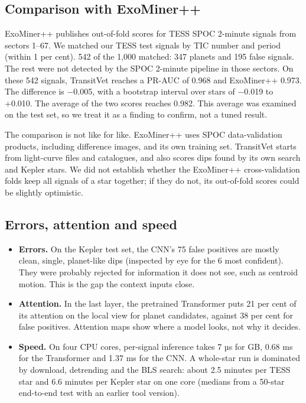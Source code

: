 \documentclass[fleqn,usenatbib]{mnras}
\providecommand{\tightlist}{\setlength{\itemsep}{0pt}\setlength{\parskip}{0pt}}
\begin{document}
\subsection{Comparison with ExoMiner++}

ExoMiner++ publishes out-of-fold scores for TESS SPOC 2-minute signals from sectors 1--67. We matched our TESS test signals by TIC number and period (within 1 per cent). 542 of the 1,000 matched: 347 planets and 195 false signals. The rest were not detected by the SPOC 2-minute pipeline in those sectors. On these 542 signals, TransitVet reaches a PR-AUC of 0.968 and ExoMiner++ 0.973. The difference is −0.005, with a bootstrap interval over stars of −0.019 to +0.010. The average of the two scores reaches 0.982. This average was examined on the test set, so we treat it as a finding to confirm, not a tuned result.

The comparison is not like for like. ExoMiner++ uses SPOC data-validation products, including difference images, and its own training set. TransitVet starts from light-curve files and catalogues, and also scores dips found by its own search and Kepler stars. We did not establish whether the ExoMiner++ cross-validation folds keep all signals of a star together; if they do not, its out-of-fold scores could be slightly optimistic.

\subsection{Errors, attention and speed}

\begin{itemize}
\tightlist
\item
  \textbf{Errors.} On the Kepler test set, the CNN's 75 false positives are mostly clean, single, planet-like dips (inspected by eye for the 6 most confident). They were probably rejected for information it does not see, such as centroid motion. This is the gap the context inputs close.
\item
  \textbf{Attention.} In the last layer, the pretrained Transformer puts 21 per cent of its attention on the local view for planet candidates, against 38 per cent for false positives. Attention maps show where a model looks, not why it decides.
\item
  \textbf{Speed.} On four CPU cores, per-signal inference takes 7 µs for GB, 0.68 ms for the Transformer and 1.37 ms for the CNN. A whole-star run is dominated by download, detrending and the BLS search: about 2.5 minutes per TESS star and 6.6 minutes per Kepler star on one core (medians from a 50-star end-to-end test with an earlier tool version).
\end{itemize}
\end{document}
